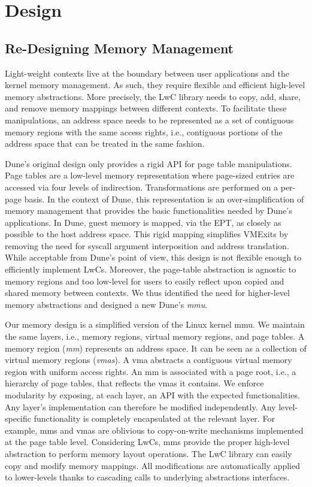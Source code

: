 \chapter{Design}

\section{Re-Designing Memory Management}

Light-weight contexts live at the boundary between user applications and the kernel memory management.
As such, they require flexible and efficient high-level memory abstractions.
More precisely, the LwC library needs to copy, add, share, and remove memory mappings between different contexts.
To facilitate these manipulations, an address space needs to be represented as a set of contiguous memory regions with the same access rights, i.e., contiguous portions of the address space that can be treated in the same fashion.

Dune's original design only provides a rigid API for page table manipulations.
Page tables are a low-level memory representation where page-sized entries are accessed via four levels of indirection.
Transformations are performed on a per-page basis.
In the context of Dune, this representation is an over-simplification of memory management that provides the basic functionalities needed by Dune's applications.
In Dune, guest memory is mapped, via the EPT, as closely as possible to the host address space.
This rigid mapping simplifies VMExits by removing the need for syscall argument interposition and address translation.
While acceptable from Dune's point of view, this design is not flexible enough to efficiently implement LwCs.
Moreover, the page-table abstraction is agnostic to memory regions and too low-level for users to easily reflect upon copied and shared memory between contexts.
We thus identified the need for higher-level memory abstractions and designed a new Dune's \textit{mmu}.

Our memory design is a simplified version of the Linux kernel mmu.
We maintain the same layers, i.e., memory regions, virtual memory regions, and page tables.
A memory region (\textit{mm}) represents an address space.
It can be seen as a collection of virtual memory regions (\textit{vmas}).
A vma abstracts a contiguous virtual memory region with uniform access rights.
An mm is associated with a page root, i.e., a hierarchy of page tables, that reflects the vmas it contains.
We enforce modularity by exposing, at each layer, an API with the expected functionalities.
Any layer's implementation can therefore be modified independently.
Any level-specific functionality is completely encapsulated at the relevant layer.
For example, mms and vmas are oblivious to copy-on-write mechanisms implemented at the page table level.
Considering LwCs, mms provide the proper high-level abstraction to perform memory layout operations.
The LwC library can easily copy and modify memory mappings.
All modifications are automatically applied to lower-levels thanks to cascading calls to underlying abstractions interfaces.

